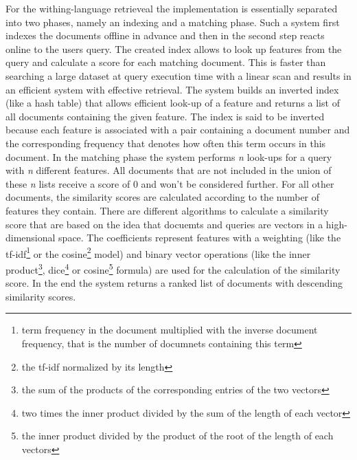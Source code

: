 \documentclass[journal]{IEEEtran}
\begin{document}
For the withing-language retrieveal the implementation is essentially separated into two phases, namely an indexing and a matching phase. Such a system first indexes the documents offline in advance and then in the second step reacts online to the users query. The created index allows to look up features from the query and calculate a score for each matching document. This is faster than searching a large dataset at query execution time with a linear scan and results in an efficient system with effective retrieval. The system builds an inverted index (like a hash table) that allows efficient look-up of a feature and returns a list of all documents containing the given feature. The index is said to be inverted because each feature is associated with a pair containing a document number and the corresponding frequency that denotes how often this term occurs in this document. In the matching phase the system performs {\it n} look-ups for a query with {\it n} different features. All documents that are not included in the union of these {\it n} lists receive a score of 0 and won't be considered further. For all other documents, the similarity scores are calculated according to the number of features they contain. There are different algorithms to calculate a similarity score that are based on the idea that docuemts and queries are vectors in a high-dimensional space. The coefficients represent features with a weighting (like the tf-idf\footnote{term frequency in the document multiplied with the inverse document frequency, that is the number of documnets containing this term} or the cosine\footnote{the tf-idf normalized by its length} model) and binary vector operations (like the inner product\footnote{the sum of the products of the corresponding entries of the two vectors}, dice\footnote{two times the inner product divided by the sum of the length of each vector} or cosine\footnote{the inner product divided by the product of the root of the length of each vectors} formula) are used for the calculation of the similarity score. In the end the system returns a ranked list of documents with descending similarity scores.
\end{document}
